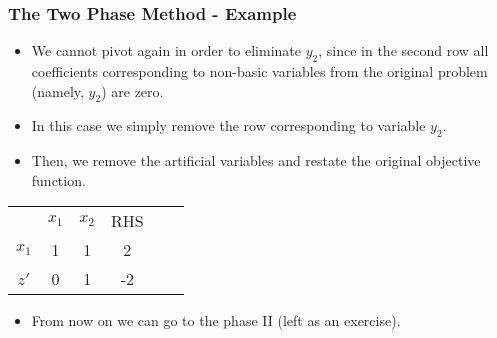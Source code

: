 \documentclass{beamer}
\theoremstyle{plain}
\begin{document}
\begin{frame}\frametitle{The Two Phase Method - Example}
\justifying


\begin{itemize}
\justifying

\item We cannot pivot again in order to eliminate $ y_2 $, since in the second row all coefficients corresponding to non-basic variables from the original problem (namely, $ y_2 $) are zero.

\item In this case we simply remove the row corresponding to variable $ y_2 $.

\item Then, we remove the artificial variables and restate the original objective function.

\end{itemize}

\begin{center}
\vspace{-0.3cm}
\begin{tabular}{c|cc|ccc}	
& $ x_1 $ & $ x_2 $ & {\tiny RHS}  && \\
\cline{1-4}
$ x_1 $ & 1 & 1 & 2 & & \\
\cline{1-4}	
$ z' $ & 0& 1&  -2  & & \\
\end{tabular}
\end{center}

\begin{itemize}
\justifying

\item From now on we can go to the phase II (left as an exercise).

\end{itemize}

\end{frame}
\end{document}
